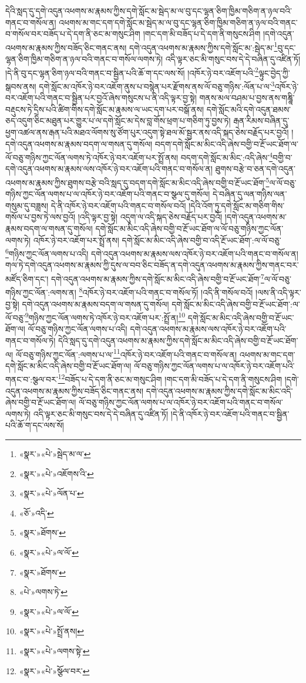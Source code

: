 དེའི་སླད་དུ་དགེ་འདུན་འཕགས་མ་རྣམས་ཀྱིས་དགེ་སློང་མ་སྦེད་མ་ལ་བུ་དང་ལྷན་ཅིག་ཁྱིམ་གཅིག་ན་ཉལ་བའི་གནང་བ་གསོལ་ན། འཕགས་མ་གང་དག་དགེ་སློང་མ་སྦེད་མ་ལ་བུ་དང་ལྷན་ཅིག་ཁྱིམ་གཅིག་ན་ཉལ་བའི་གནང་བ་གསོལ་བར་བཟོད་པ་དེ་དག་ནི་ཅང་མ་གསུང་ཤིག །གང་དག་མི་བཟོད་པ་དེ་དག་ནི་གསུངས་ཤིག །དགེ་འདུན་འཕགས་མ་རྣམས་ཀྱིས་བཟོད་ཅིང་གནང་ནས། དགེ་འདུན་འཕགས་མ་རྣམས་ཀྱིས་དགེ་སློང་མ་:སྦེད་མ་\footnote{«སྣར་»«པེ་»སྦེད་མ་ལ་}བུ་དང་ལྷན་ཅིག་ཁྱིམ་གཅིག་ན་ཉལ་བའི་གནང་བ་གསོལ་ལགས་ཏེ། འདི་ལྟར་ཅང་མི་གསུང་བས་དེ་དེ་བཞིན་དུ་འཛིན་ཏོ། །དེ་ནི་བུ་དང་ལྷན་ཅིག་ཉལ་བའི་གནང་བ་སྦྱིན་པའི་ཆོ་ག་དང་ལས་སོ། །འཁོར་ཉེ་བར་འཇོག་པའི་\footnote{«སྣར་»«པེ་»འཇོགས་འི་}ལྟུང་བྱེད་ཀྱི་སྒབས་ནས། དགེ་སློང་མ་འཁོར་ཉེ་བར་འཇོག་ནུས་པ་བསྙེན་པར་རྫོགས་ནས་ལོ་བཅུ་གཉིས་:ལོན་པ་ལ་\footnote{«སྣར་»«པེ་»ལོན་པ་}འཁོར་ཉེ་བར་འཇོག་པའི་གནང་བ་སྦྱིན་པར་བྱའོ་ཞེས་གསུངས་པ་ནི་འདི་ལྟར་བྱ་སྟེ། གནས་མལ་བཤམ་པ་བྱས་ནས་གཎྜཱི་བརྡུངས་ཏེ་དྲིས་པའི་ཚིག་གིས་དགེ་སློང་མ་རྣམས་ལ་ཡང་དག་པར་བསྒོ་ནས། དགེ་སློང་མའི་དགེ་འདུན་ཐམས་ཅད་འདུག་ཅིང་མཐུན་པར་གྱུར་པ་ལ་དགེ་སློང་མ་དེས་བླ་གོས་ཕྲག་པ་གཅིག་ཏུ་བྱས་ཏེ། རྒན་རིམས་བཞིན་དུ་ཕྱག་འཚལ་ནས་རྒན་པའི་མཐའ་ལོགས་སུ་ཙོག་པུར་འདུག་སྟེ་ཐལ་མོ་སྦྱར་ནས་འདི་སྐད་ཅེས་བརྗོད་པར་བྱའོ། །དགེ་འདུན་འཕགས་མ་རྣམས་བདག་ལ་གསན་དུ་གསོལ། བདག་དགེ་སློང་མ་མིང་འདི་ཞེས་བགྱི་བ་རྔོ་ཡང་ཐོག་ལ་ལོ་བཅུ་གཉིས་ཀྱང་ལོན་ལགས་ཏེ་འཁོར་ཉེ་བར་འཇོག་པར་སྤྲོ་ནས། བདག་དགེ་སློང་མ་མིང་:འདི་ཞེས་\footnote{«ཅོ་»འདི་}བགྱི་བ་དགེ་འདུན་འཕགས་མ་རྣམས་ལས་འཁོར་ཉེ་བར་འཇོག་པའི་གནང་བ་གསོལ་ན། ཐུགས་བརྩེ་བ་ཅན་དགེ་འདུན་འཕགས་མ་རྣམས་ཀྱིས་ཐུགས་བརྩེ་བའི་སླད་དུ་བདག་དགེ་སློང་མ་མིང་འདི་ཞེས་བགྱི་བ་རྔོ་ཡང་ཐོག་\footnote{«སྣར་»ཐོགས་}ལ་ལོ་བཅུ་གཉིས་ཀྱང་ལོན་ལགས་པ་ལ་འཁོར་ཉེ་བར་འཇོག་པའི་གནང་བ་སྩལ་དུ་གསོལ། དེ་བཞིན་དུ་ལན་གཉིས་ལན་གསུམ་དུ་བཟླས། དེ་ནི་འཁོར་ཉེ་བར་འཇོག་པའི་གནང་བ་གསོལ་བའོ། །དེའི་འོག་ཏུ་དགེ་སློང་མ་གཅིག་གིས་གསོལ་པ་བྱས་ཏེ་ལས་བྱའོ། །འདི་ལྟར་བྱ་སྟེ། འདུག་ལ་འདི་སྐད་ཅེས་བརྗོད་པར་བྱའོ། །དགེ་འདུན་འཕགས་མ་རྣམས་བདག་ལ་གསན་དུ་གསོལ། དགེ་སློང་མ་མིང་འདི་ཞེས་བགྱི་བ་རྔོ་ཡང་ཐོག་ལ་ལོ་བཅུ་གཉིས་ཀྱང་ལོན་ལགས་ཏེ། འཁོར་ཉེ་བར་འཇོག་པར་སྤྲོ་ནས། དགེ་སློང་མ་མིང་འདི་ཞེས་བགྱི་བ་འདི་རྔོ་ཡང་ཐོག་:ལ་ལོ་བཅུ་\footnote{«སྣར་»«པེ་»ལ་ལོ་}གཉིས་ཀྱང་ལོན་ལགས་པ་འདི། དགེ་འདུན་འཕགས་མ་རྣམས་ལས་འཁོར་ཉེ་བར་འཇོག་པའི་གནང་བ་གསོལ་ན། གལ་ཏེ་དགེ་འདུན་འཕགས་མ་རྣམས་ཀྱི་དུས་ལ་བབ་ཅིང་བཟོད་ན་དགེ་འདུན་འཕགས་མ་རྣམས་ཀྱིས་གནང་བར་མཛོད་ཅིག་དང་། དགེ་འདུན་འཕགས་མ་རྣམས་ཀྱིས་དགེ་སློང་མ་མིང་འདི་ཞེས་བགྱི་བ་རྔོ་ཡང་ཐོག་\footnote{«སྣར་»ཐོགས་}ལ་ལོ་བཅུ་གཉིས་ཀྱང་ལོན་:ལགས་ན། \footnote{«པེ་»ལགས་ཏེ་}འཁོར་ཉེ་བར་འཇོག་པའི་གནང་བ་གསོལ་ཏོ། །འདི་ནི་གསོལ་བའོ། །ལས་ནི་འདི་ལྟར་བྱ་སྟེ། དགེ་འདུན་འཕགས་མ་རྣམས་བདག་ལ་གསན་དུ་གསོལ། དགེ་སློང་མ་མིང་འདི་ཞེས་བགྱི་བ་རྔོ་ཡང་ཐོག་:ལ་ལོ་བཅུ་\footnote{«སྣར་»«པེ་»ལ་ལོ་}གཉིས་ཀྱང་ལོན་ལགས་ཏེ་འཁོར་ཉེ་བར་འཇོག་པར་:སྤྲོ་ན།\footnote{«སྣར་»«པེ་»སྤྲོ་ནས།} དགེ་སློང་མ་མིང་འདི་ཞེས་བགྱི་བ་རྔོ་ཡང་ཐོག་ལ། ལོ་བཅུ་གཉིས་ཀྱང་ལོན་ལགས་པ་འདི། དགེ་འདུན་འཕགས་མ་རྣམས་ལས་འཁོར་ཉེ་བར་འཇོག་པའི་གནང་བ་གསོལ་ཏེ། དེའི་སླད་དུ་དགེ་འདུན་འཕགས་མ་རྣམས་ཀྱིས་དགེ་སློང་མ་མིང་འདི་ཞེས་བགྱི་བ་རྔོ་ཡང་ཐོག་ལ། ལོ་བཅུ་གཉིས་ཀྱང་ལོན་:ལགས་པ་ལ་\footnote{«སྣར་»«པེ་»ལགས་སྟེ་}འཁོར་ཉེ་བར་འཇོག་པའི་གནང་བ་གསོལ་ན། འཕགས་མ་གང་དག་དགེ་སློང་མ་མིང་འདི་ཞེས་བགྱི་བ་རྔོ་ཡང་ཐོག་ལ། ལོ་བཅུ་གཉིས་ཀྱང་ལོན་ལགས་པ་ལ་འཁོར་ཉེ་བར་འཇོག་པའི་གནང་བ་:སྩལ་བར་\footnote{«སྣར་»«པེ་»སྩོལ་བར་}བཟོད་པ་དེ་དག་ནི་ཅང་མ་གསུང་ཤིག །གང་དག་མི་བཟོད་པ་དེ་དག་ནི་གསུངས་ཤིག །དགེ་འདུན་འཕགས་མ་རྣམས་ཀྱིས་བཟོད་ཅིང་གནང་ནས། དགེ་འདུན་འཕགས་མ་རྣམས་ཀྱིས་དགེ་སློང་མ་མིང་འདི་ཞེས་བགྱི་བ་རྔོ་ཡང་ཐོག་ལ། ལོ་བཅུ་གཉིས་ཀྱང་ལོན་ལགས་པ་ལ་འཁོར་ཉེ་བར་འཇོག་པའི་གནང་བ་གསོལ་ལགས་ཏེ། འདི་ལྟར་ཅང་མི་གསུང་བས་དེ་དེ་བཞིན་དུ་འཛིན་ཏོ། །དེ་ནི་འཁོར་ཉེ་བར་འཇོག་པའི་གནང་བ་སྦྱིན་པའི་ཆོ་ག་དང་ལས་སོ། 